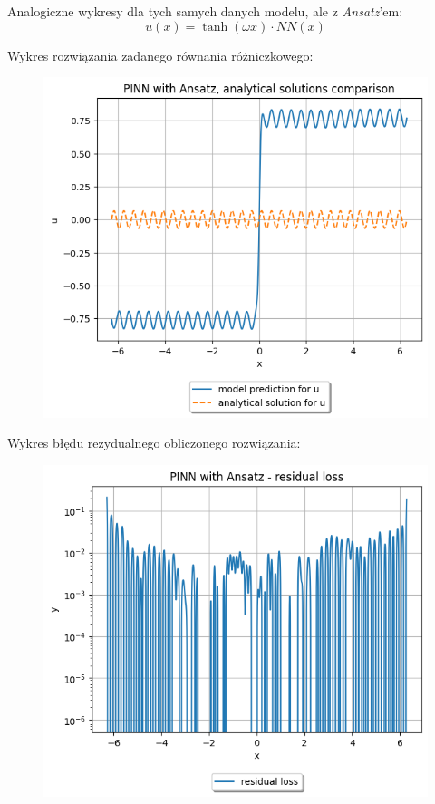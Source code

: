 \documentclass{article}
\begin{document}
Analogiczne wykresy dla tych samych danych modelu, ale z \textit{Ansatz}'em:
$$u(x) = \tanh(\omega x) \cdot NN(x) $$

Wykres rozwiązania zadanego równania różniczkowego: \\

\begin{figure}[H]
  \includegraphics[width=\linewidth]{figures/3_ans.png}
\end{figure}

Wykres błędu rezydualnego obliczonego rozwiązania:\\

\begin{figure}[H]
  \includegraphics[width=\linewidth]{figures/3_ans_residual.png}
\end{figure}
\end{document}
